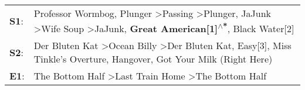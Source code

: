 \begin{supertabular}{p{0.03\textwidth}p{0.92\textwidth}}
 \textbf{S1}:  &  Professor Wormbog\textsuperscript{}, \enspace Plunger\textsuperscript{} \textgreater \enspace Passing\textsuperscript{} \textgreater \enspace Plunger\textsuperscript{}, \enspace JaJunk\textsuperscript{} \textgreater \enspace Wife Soup\textsuperscript{} \textgreater \enspace JaJunk\textsuperscript{}, \enspace \textbf{Great American[1]\textsuperscript{$\wedge$*}}, \enspace Black Water[2]\textsuperscript{}  \enspace  \\
 \textbf{S2}:  &                                                                                          Der Bluten Kat\textsuperscript{} \textgreater \enspace Ocean Billy\textsuperscript{} \textgreater \enspace Der Bluten Kat\textsuperscript{}, \enspace Easy[3]\textsuperscript{}, \enspace Miss Tinkle's Overture\textsuperscript{}, \enspace Hangover\textsuperscript{}, \enspace Got Your Milk (Right Here)\textsuperscript{}  \enspace  \\
 \textbf{E1}:  &                                                                                                                                                                                                                                                                       The Bottom Half\textsuperscript{} \textgreater \enspace Last Train Home\textsuperscript{} \textgreater \enspace The Bottom Half\textsuperscript{}  \enspace  \\
\end{supertabular}
